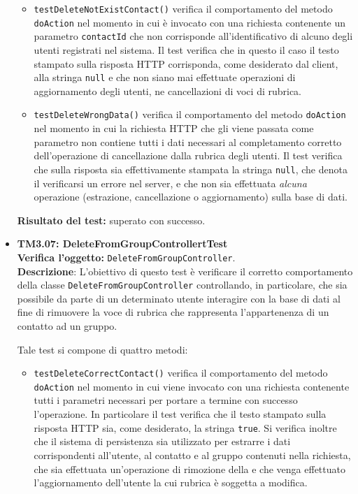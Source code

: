 \begin{itemize}
\begin{itemize}
\item \texttt{testDeleteNotExistContact()} verifica il comportamento del metodo \texttt{doAction} nel momento in cui è invocato con una richiesta contenente un parametro \texttt{contactId} che non corrisponde all'identificativo di alcuno degli utenti registrati nel sistema. Il test verifica che in questo il caso il testo stampato sulla risposta HTTP corrisponda, come desiderato dal client, alla stringa \texttt{null} e che non siano mai effettuate operazioni di aggiornamento degli utenti, ne cancellazioni di voci di rubrica.

\item \texttt{testDeleteWrongData()} verifica il comportamento del metodo \texttt{doAction} nel momento in cui la richiesta HTTP che gli viene passata come parametro non contiene tutti i dati necessari al completamento corretto dell'operazione di cancellazione dalla rubrica degli utenti. Il test verifica che sulla risposta sia effettivamente stampata la stringa \texttt{null}, che denota il verificarsi un errore nel server, e che non sia effettuata \textit{alcuna} operazione (estrazione, cancellazione o aggiornamento) sulla base di dati.
\end{itemize}
\textbf{Risultato del test:} superato con successo.


\item \textbf{TM3.07: DeleteFromGroupControllertTest}\\
\textbf{Verifica l'oggetto:} \texttt{DeleteFromGroupController}.\\
\textbf{Descrizione}: L'obiettivo di questo test è verificare il corretto comportamento della classe \texttt{DeleteFromGroupController} controllando, in particolare, che sia possibile da parte di un determinato utente interagire con la base di dati al fine di rimuovere la voce di rubrica che rappresenta l'appartenenza di un contatto ad un gruppo.

Tale test si compone di quattro metodi:
\begin{itemize}
\item \texttt{testDeleteCorrectContact()} verifica il comportamento del metodo \texttt{doAction} nel momento in cui viene invocato con una richiesta contenente tutti i parametri necessari per portare a termine con successo l'operazione. In particolare il test verifica che il testo stampato sulla risposta HTTP sia, come desiderato, la stringa \texttt{true}. Si verifica inoltre che il sistema di persistenza sia utilizzato per estrarre i dati corrispondenti all'utente, al contatto e al gruppo contenuti nella richiesta, che sia effettuata un'operazione di rimozione della  e che venga effettuato l'aggiornamento dell'utente la cui rubrica è soggetta a modifica.


\end{itemize}
\end{itemize}
